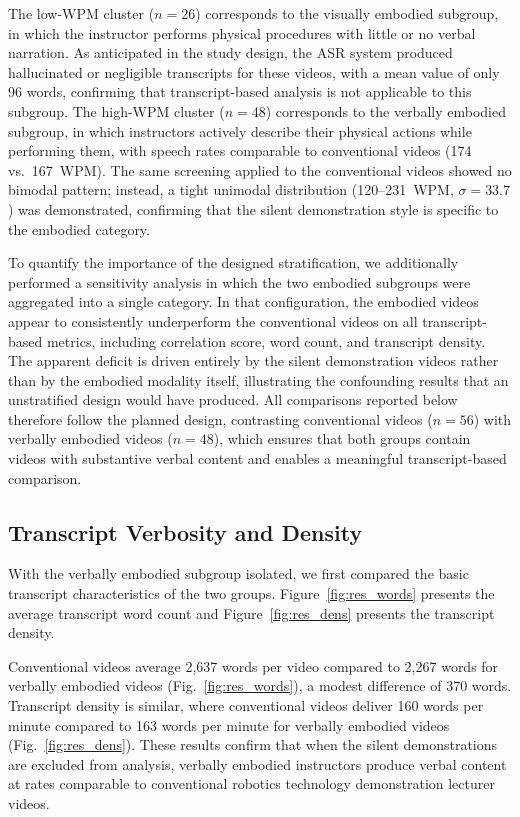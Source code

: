 The low-WPM cluster ($n = 26$) corresponds to the visually embodied subgroup, in which the instructor performs physical procedures with little or no verbal narration. As anticipated in the study design, the ASR system produced hallucinated or negligible transcripts for these videos, with a mean value of only 96 words, confirming that transcript-based analysis is not applicable to this subgroup. The high-WPM cluster ($n = 48$) corresponds to the verbally embodied subgroup, in which instructors actively describe their physical actions while performing them, with speech rates comparable to conventional videos (174 vs.\ 167~WPM). The same screening applied to the conventional videos showed no bimodal pattern; instead, a tight unimodal distribution (120--231~WPM, $\sigma = 33.7$) was demonstrated, confirming that the silent demonstration style is specific to the embodied category.

To quantify the importance of the designed stratification, we additionally performed a sensitivity analysis in which the two embodied subgroups were aggregated into a single category. In that configuration, the embodied videos appear to consistently underperform the conventional videos on all transcript-based metrics, including correlation score, word count, and transcript density. The apparent deficit is driven entirely by the silent demonstration videos rather than by the embodied modality itself, illustrating the confounding results that an unstratified design would have produced. All comparisons reported below therefore follow the planned design, contrasting conventional videos ($n = 56$) with verbally embodied videos ($n = 48$), which ensures that both groups contain videos with substantive verbal content and enables a meaningful transcript-based comparison.


\subsection{Transcript Verbosity and Density}

With the verbally embodied subgroup isolated, we first compared the basic transcript characteristics of the two groups. Figure~\ref{fig:res_words} presents the average transcript word count and Figure~\ref{fig:res_dens} presents the transcript density.

Conventional videos average 2{,}637 words per video compared to 2{,}267 words for verbally embodied videos (Fig.~\ref{fig:res_words}), a modest difference of 370 words. Transcript density is similar, where conventional videos deliver 160 words per minute compared to 163 words per minute for verbally embodied videos (Fig.~\ref{fig:res_dens}). These results confirm that when the silent demonstrations are excluded from analysis, verbally embodied instructors produce verbal content at rates comparable to conventional robotics technology demonstration lecturer videos.

